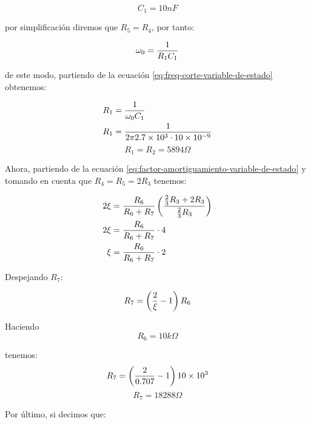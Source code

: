 \begin{equation*}
    \boxed{C_1 = 10 nF}
\end{equation*}

por simplificación diremos que $R_5 = R_4$, por tanto:

\begin{equation}
    \omega_0 = \frac{1}{R_1 C_1}
\end{equation}

de este modo, partiendo de la ecuación \ref{eq:freq-corte-variable-de-estado} obtenemos:

\begin{align*}
    R_1 &= \frac{1}{\omega_0 C_1} \\
    R_1 &= \frac{1}{2\pi 2.7\times 10^3 \cdot 10\times 10^{-9}} \\
\end{align*}
\begin{equation}
    \boxed{R_1 = R_2 = 5894 \Omega}
\end{equation}

Ahora, partiendo de la ecuación \ref{eq:factor-amortiguamiento-variable-de-estado} y tomando en cuenta que $R_4 = R_5 = 2 R_3$ tenemos:

\begin{align*}
    2\xi &= \frac{R_6}{R_6 + R_7} \left( \frac{\frac{2}{3} R_3 + 2R_3}{\frac{2}{3} R_3} \right) \\
    2\xi &= \frac{R_6}{R_6 + R_7} \cdot 4  \\
    \xi &= \frac{R_6}{R_6 + R_7} \cdot 2 \\
\end{align*}

Despejando $R_7$:

\begin{align*}
    R_7 &= \left( \frac{2}{\xi} - 1 \right)R_6 \\
\end{align*}

Haciendo
 $$\boxed{R_6 = 10k\Omega}$$
 
tenemos:
\begin{align*}
    R_7 &= \left( \frac{2}{0.707} - 1 \right) 10\times 10^{3} \\
\end{align*}
\begin{equation}
    \boxed{R_7 = 18288\Omega}
\end{equation}

Por último, si decimos que:

